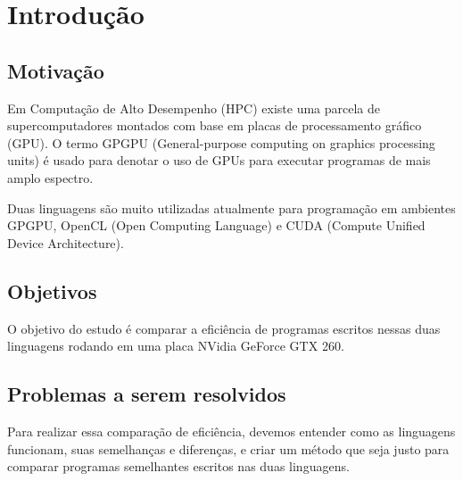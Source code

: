 \section{Introdução}
\subsection{Motivação}
Em Computação de Alto Desempenho (HPC) existe uma parcela de supercomputadores montados com base em placas
de processamento gráfico (GPU). O termo GPGPU (General-purpose computing on graphics processing units) é
usado para denotar o uso de GPUs para executar programas de mais amplo espectro.

Duas linguagens são muito utilizadas atualmente para programação em ambientes GPGPU, OpenCL (Open Computing Language) 
e CUDA (Compute Unified Device Architecture).

\subsection{Objetivos}
O objetivo do estudo é comparar a eficiência de programas escritos nessas duas linguagens rodando em uma placa NVidia GeForce GTX 260.

\subsection{Problemas a serem resolvidos}
Para realizar essa comparação de eficiência, devemos entender como as linguagens funcionam, suas semelhanças e
diferenças, e criar um método que seja justo para comparar programas semelhantes escritos nas duas linguagens.
